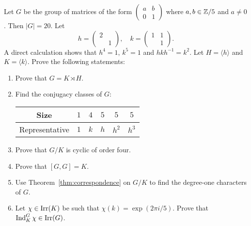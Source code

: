 


\begin{exercise}
\label{xca:Frobenius_size20}
Let $G$ be the group of matrices 
of the form $\begin{pmatrix}a&b\\0&1\end{pmatrix}$ where $a,b\in\mathbb{Z}/5$ and $a\ne 0$. Then $|G|=20$. Let 
\[
    h=\begin{pmatrix}
        2\\
        &1
    \end{pmatrix},\quad 
    k=\begin{pmatrix}
        1&1\\
        &1
    \end{pmatrix}.
\]
A direct calculation shows that 
$h^4=1$, $k^5=1$ and $hkh^{-1}=k^2$. Let $H=\langle h\rangle$ 
and $K=\langle k\rangle$. Prove the following statements: 

\begin{enumerate}
    \item Prove that $G=K\rtimes H$.
    \item Find the conjugacy classes of $G$: 
\begin{center}
        \begin{tabular}{cccccc}
             Size & $1$ & $4$ & $5$ & $5$ & $5$\\
             \hline 
             Representative & $1$ & $k$ & $h$ & $h^2$ & $h^3$\\
        \end{tabular}
\end{center}
\item Prove that $G/K$ is cyclic of order four. 
\item Prove that $[G,G]=K$. 
\item Use Theorem~\ref{thm:correspondence} on $G/K$ 
    to find the degree-one characters of $G$. 
\item Let $\chi\in\operatorname{Irr}(K)$ be such that $\chi(k)=\exp(2\pi i/5)$. Prove that 
$\operatorname{Ind}_K^G\chi\in\operatorname{Irr}(G)$. 
\end{enumerate}
\end{exercise}

